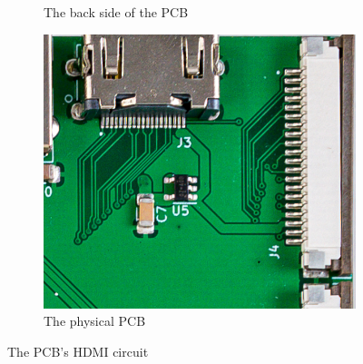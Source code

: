 \begin{figure}[t]
\begin{subfigure}{.33\textwidth}
    \caption{The back side of the PCB}
    \label{fig:HDMICircuitBack}
  \end{subfigure}%
  \begin{subfigure}{.33\textwidth}
    \centering
    \includegraphics[width=1\linewidth]{Figures/pcb/crops/hdmi}
    \caption{The physical PCB}
    \label{fig:HDMICircuitReal}
  \end{subfigure}
  \caption[PCB HDMI Circuit]{The PCB's HDMI circuit}
  \label{fig:HDMICircuit}
\end{figure}

